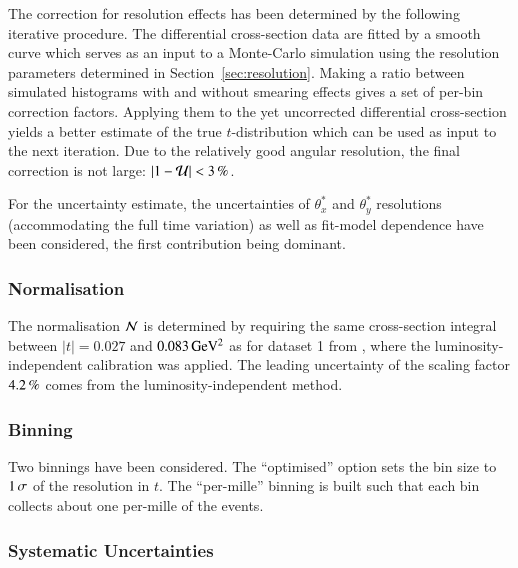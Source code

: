 The correction for resolution effects has been determined by the following iterative procedure. The differential cross-section data are fitted by a smooth curve which serves as an input to a Monte-Carlo simulation using the resolution parameters determined in Section~\ref{sec:resolution}. Making a ratio between simulated histograms with and without smearing effects gives a set of per-bin correction factors. Applying them to the yet uncorrected differential cross-section yields a better estimate of the true $t$-distribution which can be used as input to the next iteration. Due to the relatively good angular resolution, the final correction is not large: $|1 - {\cal U}| < 3\,{\rm \%}$.

For the uncertainty estimate, the uncertainties of $\theta_x^*$ and $\theta_y^*$ resolutions (accommodating the full time variation) as well as fit-model dependence have been considered, the first contribution being dominant.




\subsubsection{Normalisation}
\label{sec:normalisation}

The normalisation ${\cal N}$ is determined by requiring the same cross-section integral between $|t| = 0.027$ and $0.083\,{\rm GeV^2}$ as for dataset 1 from \cite{prl111}, where the luminosity-independent calibration was applied. The leading uncertainty of the scaling factor $4.2\,{\rm \%}$ comes from the luminosity-independent \linebreak method.




\subsubsection{Binning}
\label{sec:binning}

Two binnings have been considered. The ``optimised'' option sets the bin size to $1\,{\rm \sigma}$ of the resolution in $t$. The ``per-mille'' binning is built such that each bin collects about one per-mille of the events.



\subsubsection{Systematic Uncertainties}
\label{sec:systematics}

